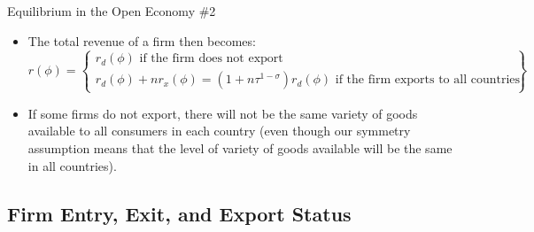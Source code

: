\documentclass[aspectratio=169]{beamer}
\begin{document}
\begin{frame}{Equilibrium in the Open Economy \#2}

\begin{itemize}
    \item<1-> The total revenue of a firm then becomes:
    \begin{equation*}
        r\left( \phi \right) = \left\{ \begin{matrix}
             r_{d}\left( \phi \right) \text{ if the firm does not export} \\
             r_{d}\left( \phi \right) + nr_{x}\left( \phi \right) = \left( 1 + n\tau^{1 - \sigma} \right) r_{d}\left( \phi \right) \text{ if the firm exports to all countries}
        \end{matrix} \right\}
    \end{equation*}
    \item<2->  If some firms do not export, there will not be the same variety of goods available to all consumers in each country (even though our symmetry assumption means that the level of variety of goods available will be the same in all countries).
\end{itemize}
    
\end{frame}


\subsection{Firm Entry, Exit, and Export Status}

\end{document}
